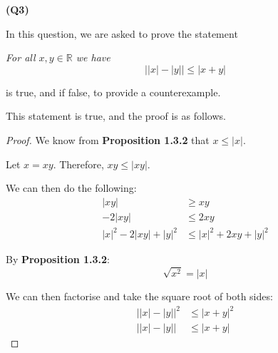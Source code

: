 \documentclass[12pt, a4paper]{article}
\newcommand{\R}{\mathbb{R}}
\begin{document}
\noindent\textbf{(Q3)}

\noindent In this question, we are asked to prove the statement

\textit{For all $x,y \in \R$ we have}
\[
    \big | |x| - |y| \big | \leq |x + y|
\]

\noindent is true, and if false, to provide a counterexample.

\noindent This statement is true, and the proof is as follows.

\begin{proof}
    We know from \textbf{Proposition 1.3.2} that $x \leq |x|$.

    Let $x = xy$. Therefore, $xy \leq |xy|$.

    We can then do the following:
    \begin{align*}
        |xy| & \geq xy\\
        -2|xy| & \leq 2xy\\
        |x|^2 -2|xy| + |y|^2 & \leq |x|^2 + 2xy + |y|^2
    \end{align*}

    By \textbf{Proposition 1.3.2}:
    \[
        \sqrt{x^2} = |x|
    \]

    We can then factorise and take the square root of both sides:
    \begin{align*}
        \big | |x| - |y| \big |^2 & \leq |x + y|^2\\
        \big | |x| - |y| \big | & \leq |x + y|
    \end{align*}

\end{proof}
\end{document}
